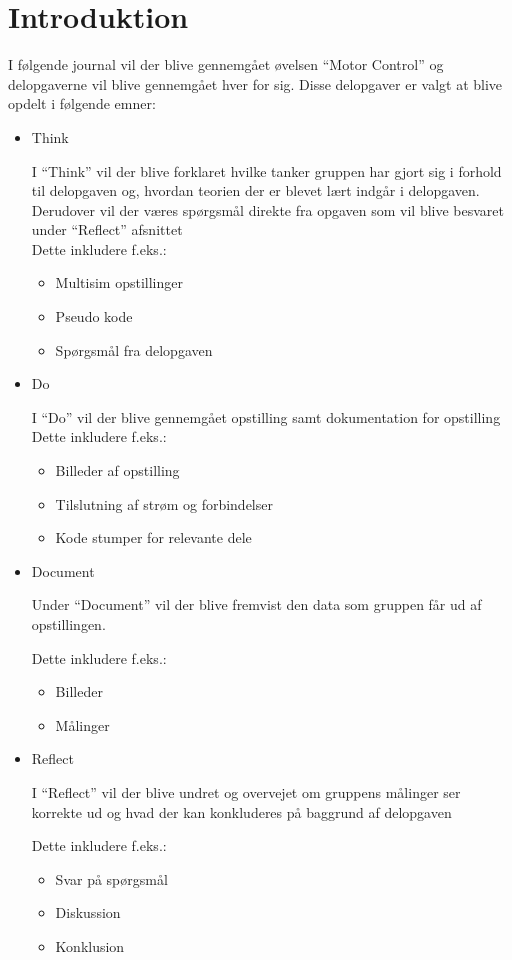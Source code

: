 \documentclass{article}
\begin{document}
\section{Introduktion}
I følgende journal vil der blive gennemgået øvelsen ``Motor Control'' og delopgaverne vil blive gennemgået hver for sig. Disse delopgaver er valgt at blive opdelt i følgende emner:
\begin{itemize}
\item Think

I ``Think'' vil der blive forklaret hvilke tanker gruppen har gjort sig i forhold til delopgaven og, hvordan teorien der er blevet lært indgår i delopgaven. Derudover vil der væres spørgsmål direkte fra opgaven som vil blive besvaret under ``Reflect'' afsnittet\\
Dette inkludere f.eks.:
\begin{itemize}
\item Multisim opstillinger
\item Pseudo kode
\item Spørgsmål fra delopgaven
\end{itemize}

\item Do

I ``Do'' vil der blive gennemgået opstilling samt dokumentation for opstilling
Dette inkludere f.eks.:
\begin{itemize}
\item Billeder af opstilling
\item Tilslutning af strøm og forbindelser
\item Kode stumper for relevante dele
\end{itemize}

\item Document

Under ``Document'' vil der blive fremvist den data som gruppen får ud af opstillingen.

Dette inkludere f.eks.:
\begin{itemize}
\item Billeder
\item Målinger
\end{itemize}


\item Reflect

I ``Reflect'' vil der blive undret og overvejet om gruppens målinger ser korrekte ud og hvad der kan konkluderes på baggrund af delopgaven

Dette inkludere f.eks.:
\begin{itemize}
\item Svar på spørgsmål
\item Diskussion
\item Konklusion
\end{itemize}


\end{itemize}




\end{document}
